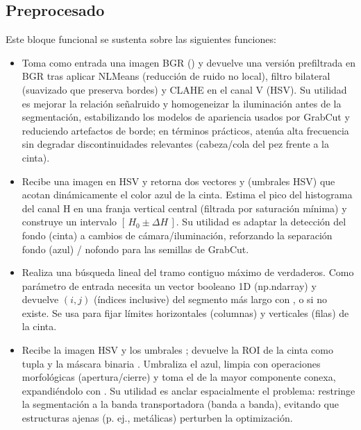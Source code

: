 \documentclass[a4paper,10pt,spanish]{jupyterBook}
\begin{document}
\subsection{Preprocesado}
\label{\detokenize{content/01/Modulo-3:preprocesado}}
\sphinxAtStartPar
Este bloque funcional se sustenta sobre las siguientes funciones:
\begin{itemize}
\item {}
\sphinxAtStartPar
{} Toma como entrada una imagen BGR () y devuelve una versión prefiltrada en BGR tras aplicar NLMeans (reducción de ruido no local), filtro bilateral (suavizado que preserva bordes) y CLAHE en el canal V (HSV). Su utilidad es mejorar la relación señal\sphinxhyphen{}ruido y homogeneizar la iluminación antes de la segmentación, estabilizando los modelos de apariencia usados por GrabCut y reduciendo artefactos de borde; en términos prácticos, atenúa alta frecuencia sin degradar discontinuidades relevantes (cabeza/cola del pez frente a la cinta).

\item {}
\sphinxAtStartPar
{} Recibe una imagen en HSV y retorna dos vectores  y  (umbrales HSV) que acotan dinámicamente el color azul de la cinta. Estima el pico del histograma del canal H en una franja vertical central (filtrada por saturación mínima) y construye un intervalo \([\,H_0\pm\Delta H\,]\). Su utilidad es adaptar la detección del fondo (cinta) a cambios de cámara/iluminación, reforzando la separación fondo (azul) / no\sphinxhyphen{}fondo para las semillas de GrabCut.

\item {}
\sphinxAtStartPar
{} Realiza una búsqueda lineal del tramo contiguo máximo de verdaderos. Como parámetro de entrada necesita un vector booleano 1D (np.ndarray) y devuelve \((i, j)\) (índices inclusive) del segmento más largo con , o  si no existe. Se usa para fijar límites horizontales (columnas) y verticales (filas) de la cinta.

\item {}
\sphinxAtStartPar
{} Recibe la imagen HSV y los umbrales ; devuelve la ROI de la cinta como tupla  y la máscara binaria . Umbraliza el azul, limpia con operaciones morfológicas (apertura/cierre) y toma el  de la mayor componente conexa, expandiéndolo con . Su utilidad es anclar espacialmente el problema: restringe la segmentación a la banda transportadora (banda a banda), evitando que estructuras ajenas (p. ej., metálicas) perturben la optimización.


\end{itemize}
\end{document}
